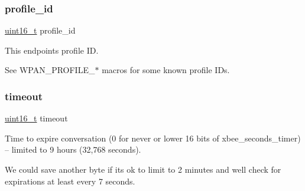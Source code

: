 \subsubsection{\texorpdfstring{profile\+\_\+id}{profile\_id}}
{\footnotesize\ttfamily \hyperlink{group__hal__dos_ga5a8b2dc9e45a9ee81a94ef304fb62505}{uint16\+\_\+t} profile\+\_\+id}



This endpoint\textquotesingle{}s profile ID. 

See W\+P\+A\+N\+\_\+\+P\+R\+O\+F\+I\+L\+E\+\_\+$\ast$ macros for some known profile I\+Ds. \mbox{\label{group__wpan__aps_ga7f1ad43d3bf79b40bc39dbb5a6c3a5ae}} 
\subsubsection{\texorpdfstring{timeout}{timeout}}
{\footnotesize\ttfamily \hyperlink{group__hal__dos_ga5a8b2dc9e45a9ee81a94ef304fb62505}{uint16\+\_\+t} timeout}



Time to expire conversation (0 for never or lower 16 bits of xbee\+\_\+seconds\+\_\+timer) -- limited to 9 hours (32,768 seconds). 

We could save another byte if it\textquotesingle{}s ok to limit to 2 minutes and we\textquotesingle{}ll check for expirations at least every 7 seconds. 